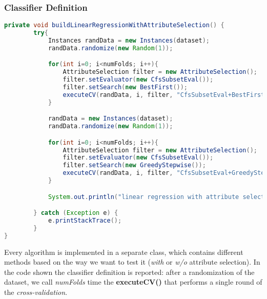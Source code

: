 \subsubsection{Classifier Definition}
\begin{lstlisting}[language=Java]
private void buildLinearRegressionWithAttributeSelection() {
        try{
            Instances randData = new Instances(dataset);
            randData.randomize(new Random(1));

            for(int i=0; i<numFolds; i++){
                AttributeSelection filter = new AttributeSelection();
                filter.setEvaluator(new CfsSubsetEval());
                filter.setSearch(new BestFirst());
                executeCV(randData, i, filter, "CfsSubsetEval+BestFirst");
            }

            randData = new Instances(dataset);
            randData.randomize(new Random(1));

            for(int i=0; i<numFolds; i++){
                AttributeSelection filter = new AttributeSelection();
                filter.setEvaluator(new CfsSubsetEval());
                filter.setSearch(new GreedyStepwise());
                executeCV(randData, i, filter, "CfsSubsetEval+GreedyStepwise");
            }

            System.out.println("linear regression with attribute selection terminated");

        } catch (Exception e) {
            e.printStackTrace();
        }
}
\end{lstlisting}

Every algorithm is implemented in a separate class, which contains different methods based on the way we want to test it (\textit{with} or \textit{w/o} attribute selection). In the code shown the classifier definition is reported: after a randomization of the dataset, we call \textit{numFolds} time the \textbf{executeCV()} that performs a single round of the \textit{cross-validation}.


